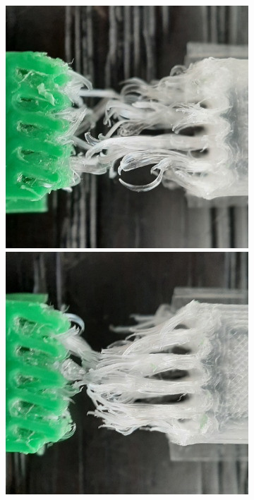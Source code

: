 \begin{figure}
\begin{subfigure}[B]{.99\columnwidth}
		\includegraphics[width=\figwidth]{sources/testing/v2_cropped.jpg}
		\includegraphics[width=\figwidth]{sources/testing/v3_cropped.jpg}

\end{subfigure}
\end{figure}
